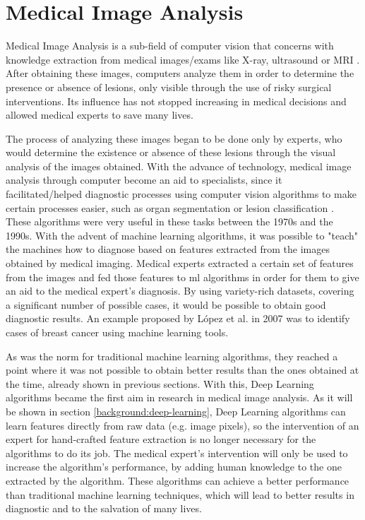 \documentclass[
  twoside,
  11pt, a4paper,
  footinclude=true,
  headinclude=true,
  cleardoublepage=empty
]{scrbook}
\begin{document}
    \section{Medical Image Analysis} \label{background:medical-image}
      Medical Image Analysis is a sub-field of computer vision that concerns with knowledge extraction from medical images/exams like X-ray, ultrasound or MRI \cite{dhawan2011medical}. After obtaining these images, computers analyze them in order to determine the presence or absence of lesions, only visible through the use of risky surgical interventions. Its influence has not stopped increasing in medical decisions and allowed medical experts to save many lives.

      The process of analyzing these images began to be done only by experts, who would determine the existence or absence of these lesions through the visual analysis of the images obtained. With the advance of technology, medical image analysis through computer become an aid to specialists, since it facilitated/helped diagnostic processes using computer vision algorithms to make certain processes easier, such as organ segmentation \cite{karssemeijer1988recognition, punia2013review} or lesion classification \cite{wolberg1994machine}. These algorithms were very useful in these tasks between the 1970s and the 1990s. With the advent of machine learning algorithms, it was possible to "teach" the machines how to diagnose based on features extracted from the images obtained by medical imaging. Medical experts extracted a certain set of features from the images and fed those features to \gls{ml} algorithms in order for them to give an aid to the medical expert's diagnosis. By using variety-rich datasets, covering a significant number of possible cases, it would be possible to obtain good diagnostic results. An example proposed by López et al. in 2007 \cite{lopez2007breast} was to identify cases of breast cancer using machine learning tools.

      As was the norm for traditional machine learning algorithms, they reached a point where it was not possible to obtain better results than the ones obtained at the time, already shown in previous sections. With this, Deep Learning algorithms became the first aim in research in medical image analysis. As it will be shown in section \ref{background:deep-learning}, Deep Learning algorithms can learn features directly from raw data (e.g. image pixels), so the intervention of an expert for hand-crafted feature extraction is no longer necessary for the algorithms to do its job. The medical expert's intervention will only be used to increase the algorithm's performance, by adding human knowledge to the one extracted by the algorithm. These algorithms can achieve a better performance than traditional machine learning techniques, which will lead to better results in diagnostic and to the salvation of many lives.
\end{document}
